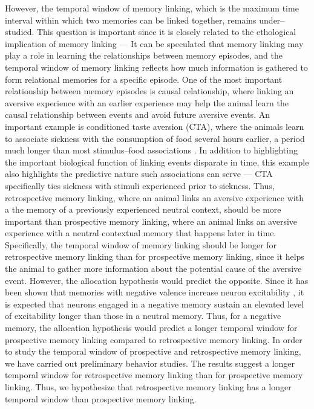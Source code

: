 \documentclass[master.tex]{subfiles}
\begin{document}
However, the temporal window of memory linking, which is the maximum time
interval within which two memories can be linked together, remains
under--studied. This question is important since it is closely related to the
ethological implication of memory linking --- It can be speculated that memory
linking may play a role in learning the relationships between memory episodes,
and the temporal window of memory linking reflects how much information is
gathered to form relational memories for a specific episode. One of the most
important relationship between memory episodes is causal relationship, where
linking an aversive experience with an earlier experience may help the animal
learn the causal relationship between events and avoid future aversive events.
An important example is conditioned taste aversion (CTA), where the animals
learn to associate sickness with the consumption of food several hours earlier,
a period much longer than most stimulus--food associations
\cite{garcia_conditioned_1955}. In addition to highlighting the important
biological function of linking events disparate in time, this example also
highlights the predictive nature such associations can serve --- CTA
specifically ties sickness with stimuli experienced prior to sickness. Thus,
retrospective memory linking, where an animal links an aversive experience with
a the memory of a previously experienced neutral context, should be more
important than prospective memory linking, where an animal links an aversive
experience with a neutral contextual memory that happens later in time.
Specifically, the temporal window of memory linking should be longer for
retrospective memory linking than for prospective memory linking, since it helps
the animal to gather more information about the potential cause of the aversive
event. However, the allocation hypothesis would predict the opposite. Since it
has been shown that memories with negative valence increase neuron excitability
\cite{mckay_intrinsic_2009, rashid_competition_2016}, it is expected that
neurons engaged in a negative memory sustain an elevated level of excitability
longer than those in a neutral memory. Thus, for a negative memory, the
allocation hypothesis would predict a longer temporal window for prospective
memory linking compared to retrospective memory linking. In order to study the
temporal window of prospective and retrospective memory linking, we have carried
out preliminary behavior studies. The results suggest a longer temporal window
for retrospective memory linking than for prospective memory linking. Thus, we
hypothesize that retrospective memory linking has a longer temporal window than
prospective memory linking.
\end{document}
